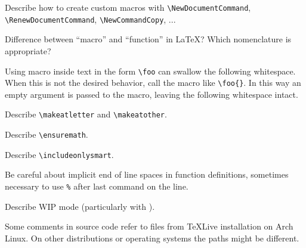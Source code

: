 \begin{Todo}
    Describe how to create custom macros with \verb|\NewDocumentCommand|, \verb|\RenewDocumentCommand|, \verb|\NewCommandCopy|, ...
\end{Todo}
\begin{Question}
    Difference between \enquote{macro} and \enquote{function} in \LaTeX{}?
    Which nomenclature is appropriate?
\end{Question}
\begin{remark}
    Using macro inside text in the form \verb|\foo| can swallow the following whitespace.
    When this is not the desired behavior, call the macro like \verb|\foo{}|.
    In this way an empty argument is passed to the macro, leaving the following whitespace intact.
\end{remark}
\begin{Todo}
    Describe \verb|\makeatletter| and \verb|\makeatother|.
\end{Todo}
\begin{Todo}
    Describe \verb|\ensuremath|.
\end{Todo}
\begin{Todo}
    Describe \verb|\includeonlysmart|.
\end{Todo}
\begin{Note}
    Be careful about implicit end of line spaces in function definitions, sometimes necessary to use \verb|%| after last command on the line.
\end{Note}
\begin{Todo}
    Describe WIP mode (particularly with \LuaTeX{}).
\end{Todo}
\begin{Note}
    Some comments in source code refer to files from \TeX{}Live installation on Arch Linux.
    On other distributions or operating systems the paths might be different.
\end{Note}
